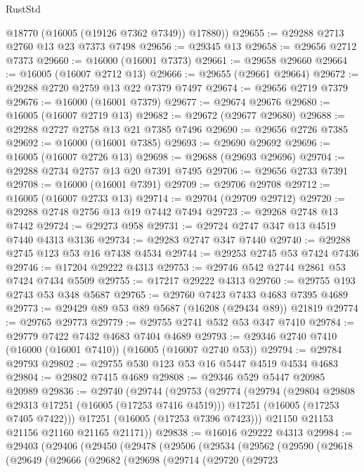 \begin{lexlean}{RustStd}
\begin{coremodule}
        @18770
        (@16005 (@19126 @7362 @7349))
        @17880))
@29655 := @29288 @2713 @2760 @13 @23 @7373 @7498
@29656 := @29345 @13
@29658 := @29656 @2712 @7373
@29660 := @16000 (@16001 @7373)
@29661 := @29658 @29660
@29664 := @16005 (@16007 @2712 @13)
@29666 := @29655 (@29661 @29664)
@29672 := @29288 @2720 @2759 @13 @22 @7379 @7497
@29674 := @29656 @2719 @7379
@29676 := @16000 (@16001 @7379)
@29677 := @29674 @29676
@29680 := @16005 (@16007 @2719 @13)
@29682 := @29672 (@29677 @29680)
@29688 := @29288 @2727 @2758 @13 @21 @7385 @7496
@29690 := @29656 @2726 @7385
@29692 := @16000 (@16001 @7385)
@29693 := @29690 @29692
@29696 := @16005 (@16007 @2726 @13)
@29698 := @29688 (@29693 @29696)
@29704 := @29288 @2734 @2757 @13 @20 @7391 @7495
@29706 := @29656 @2733 @7391
@29708 := @16000 (@16001 @7391)
@29709 := @29706 @29708
@29712 := @16005 (@16007 @2733 @13)
@29714 := @29704 (@29709 @29712)
@29720 := @29288 @2748 @2756 @13 @19 @7442 @7494
@29723 := @29268 @2748 @13 @7442
@29724 := @29273 @958
@29731 := @29724 @2747 @347 @13 @4519 @7440 @4313 @3136
@29734 := @29283 @2747 @347 @7440
@29740 := @29288 @2745 @123 @53 @16 @7438 @4534
@29744 := @29253 @2745 @53 @7424 @7436
@29746 := @17204 @29222 @4313
@29753 := @29746 @542 @2744 @2861 @53 @7424 @7434 @5509
@29755 := @17217 @29222 @4313
@29760 := @29755 @193 @2743 @53 @348 @5687
@29765 := @29760 @7423 @7433 @4683 @7395 @4689
@29773 := @29429 @89 @53 @89 @5687 (@16208 (@29434 @89)) @21819
@29774 := @29765 @29773
@29779 := @29755 @2741 @532 @53 @347 @7410
@29784 := @29779 @7422 @7432 @4683 @7404 @4689
@29793 := @29346 @2740 @7410 (@16000 (@16001 @7410)) (@16005 (@16007 @2740 @53))
@29794 := @29784 @29793
@29802 := @29755 @530 @123 @53 @16 @5447 @4519 @4534 @4683
@29804 := @29802 @7415 @4689
@29808 := @29346 @529 @5447 @20985 @20989
@29836 := @29740
    (@29744
      (@29753
        (@29774
          (@29794
            (@29804 @29808 @29313 @17251 (@16005 (@17253 @7416 @4519)))
            @17251
            (@16005 (@17253 @7405 @7422)))
          @17251
          (@16005 (@17253 @7396 @7423)))
        @21150
        @21153
        @21156
        @21160
        @21165
        @21171))
@29838 := @16016 @29222 @4313
@29984 := @29403
    (@29406
      (@29450
        (@29478
          (@29506
            (@29534
              (@29562
                (@29590
                  (@29618
                    (@29649
                      (@29666
                        (@29682
                          (@29698
                            (@29714
                              (@29720
                                (@29723

\end{coremodule}
\end{lexlean}
